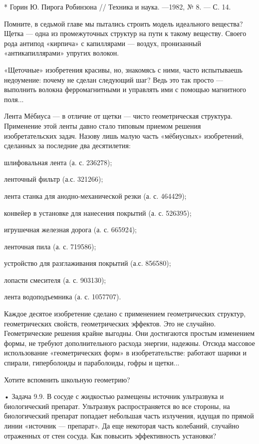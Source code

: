 * Горин Ю. Пирога Робинзона // Техника и наука. —1982, № 8. — С. 14.



Помните,  в  седьмой  главе  мы  пытались  строить  модель  идеального
вещества?  Щетка —  одна из  промежуточных структур  на пути  к такому
веществу.  Своего  рода  антипод  «кирпича» с  капиллярами  —  воздух,
пронизанный «антикапиллярами» упругих волокон.

«Щеточные»   изобретения  красивы,   но,  знакомясь   с  ними,   часто
испытываешь недоумение: почему  не сделан следующий шаг?  Ведь это так
просто — выполнить  волокна ферромагнитными и управлять  ими с помощью
магнитного поля...


Лента  Мёбиуса   —  в   отличие  от   щетки  —   чисто  геометрическая
структура.  Применение   этой  ленты   давно  стало   типовым  приемом
решения изобретательских  задач. Назову  лишь малую  часть «мёбиусных»
изобретений, сделанных за последние два десятилетия:

шлифовальная лента (а. с. 236278);

ленточный фильтр (а.с. 321266);

лента станка для анодно-механической резки (а. с. 464429);

конвейер в установке для нанесения покрытий (а. с. 526395);

игрушечная железная дорога (а. с. 665924);

ленточная пила (а. с. 719586);

устройство для разглаживания покрытий (а.с. 856580);

лопасти смесителя (а. с. 903130);

лента водоподъемника (а. с. 1057707).

Каждое  десятое  изобретение   сделано  с  применением  геометрических
структур,  геометрических  свойств,  геометрических эффектов.  Это  не
случайно.  Геометрические  решения  крайне  выгодны.  Они  достигаются
простым   изменением  формы,   не   требуют  дополнительного   расхода
энергии, надежны. Отсюда  массовое использование «геометрических форм»
в  изобретательстве:   работают  шарики  и  спирали,   гиперболоиды  и
параболоиды, гофры и щетки...

Хотите вспомнить школьную геометрию?

• Задача  9.9. В сосуде  с жидкостью размещены источник  ультразвука и
биологический препарат. Ультразвук распространяется во все стороны, на
биологический препарат  попадает небольшая часть излучения,  идущая по
прямой линии «источник — препарат».  Да еще некоторая часть колебаний,
случайно  отраженных  от  стен   сосуда.  Как  повысить  эффективность
установки?

